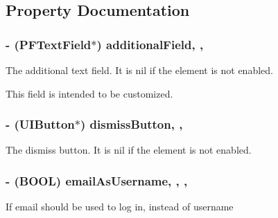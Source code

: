 \subsection{Property Documentation}
\hypertarget{interface_p_f_sign_up_view_ad99c2db623f95565e79418076b0bc111}{}
\subsubsection[{additional\+Field}]{\setlength{\rightskip}{0pt plus 5cm}-\/ ({\bf P\+F\+Text\+Field}$\ast$) additional\+Field\hspace{0.3cm}{\ttfamily [read]}, {\ttfamily [nonatomic]}, {\ttfamily [strong]}}\label{interface_p_f_sign_up_view_ad99c2db623f95565e79418076b0bc111}
The additional text field. It is {\ttfamily nil} if the element is not enabled.

This field is intended to be customized. \hypertarget{interface_p_f_sign_up_view_a3fce84d1b1027eb046a887f2efe3e156}{}
\subsubsection[{dismiss\+Button}]{\setlength{\rightskip}{0pt plus 5cm}-\/ (U\+I\+Button$\ast$) dismiss\+Button\hspace{0.3cm}{\ttfamily [read]}, {\ttfamily [nonatomic]}, {\ttfamily [strong]}}\label{interface_p_f_sign_up_view_a3fce84d1b1027eb046a887f2efe3e156}
The dismiss button. It is {\ttfamily nil} if the element is not enabled. \hypertarget{interface_p_f_sign_up_view_ad1e6db575f9bd76e4c952a4b9bf48347}{}
\subsubsection[{email\+As\+Username}]{\setlength{\rightskip}{0pt plus 5cm}-\/ (B\+O\+O\+L) email\+As\+Username\hspace{0.3cm}{\ttfamily [read]}, {\ttfamily [write]}, {\ttfamily [nonatomic]}, {\ttfamily [assign]}}\label{interface_p_f_sign_up_view_ad1e6db575f9bd76e4c952a4b9bf48347}
If email should be used to log in, instead of username

